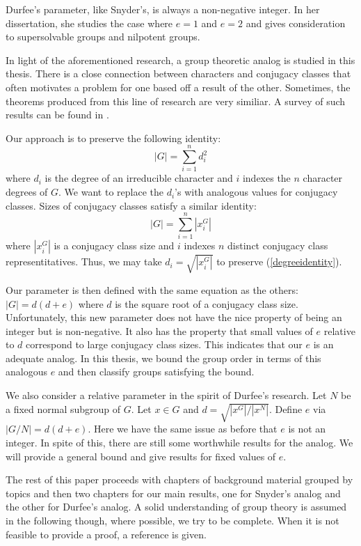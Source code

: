 \documentclass[main.tex]{subfiles}
\begin{document}
\hss

\noindent Durfee's parameter, like Snyder's, is always a non-negative integer. In her dissertation, she studies the case where $e = 1$ and $e = 2$ and gives consideration to supersolvable groups and nilpotent groups.

\hss

In light of the aforementioned research, a group theoretic analog is studied in this thesis. There is a close connection between characters and conjugacy classes that often motivates a problem for one based off a result of the other. Sometimes, the theorems produced from this line of research are very similiar. A survey of such results can be found in \cite{chillagarticle}.

Our approach is to preserve the following identity:
\begin{equation}\label{degreeidentity}
|G| = \sum_{i=1}^n d_i^2
\end{equation}
where $d_i$ is the degree of an irreducible character and $i$ indexes the $n$ character degrees of $G$. We want to replace the $d_i$'s with analogous values for conjugacy classes. Sizes of conjugacy classes satisfy a similar identity:
$$|G| = \sum_{i=1}^n |x_i^G|$$
where $|x_i^G|$ is a conjugacy class size and $i$ indexes $n$ distinct conjugacy class representitatives. Thus, we may take $d_i = \sqrt{|x_i^G|}$ to preserve (\ref{degreeidentity}).

Our parameter is then defined with the same equation as the others: $|G| = d(d+e)$ where $d$ is the square root of a conjugacy class size. Unfortunately, this new parameter does not have the nice property of being an integer but is non-negative. It also has the property that small values of $e$ relative to $d$ correspond to large conjugacy class sizes. This indicates that our $e$ is an adequate analog. In this thesis, we bound the group order in terms of this analogous $e$ and then classify groups satisfying the bound.

We also consider a relative parameter in the spirit of Durfee's research. Let $N$ be a fixed normal subgroup of $G$. Let $x \in G$ and $d = \sqrt{|x^G|/|x^N|}$. Define $e$ via $|G/N| = d(d+e)$. Here we have the same issue as before that $e$ is not an integer. In spite of this, there are still some worthwhile results for the analog. We will provide a general bound and give results for fixed values of $e$.

The rest of this paper proceeds with chapters of background material grouped by topics and then two chapters for our main results, one for Snyder's analog and the other for Durfee's analog. A solid understanding of group theory is assumed in the following though, where possible, we try to be complete. When it is not feasible to provide a proof, a reference is given.
\end{document}
